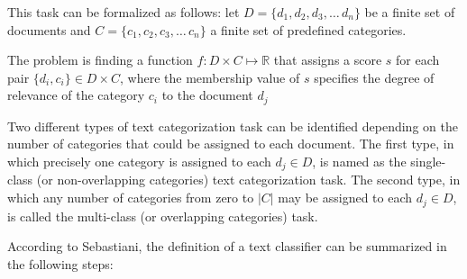 This task can be formalized as follows: let $D = \{d_1,d_2,d_3,\ldots\,d_n\}$ be a finite set of documents and $C = \{c_1,c_2,c_3,\ldots\,c_n\}$ a finite set of predefined categories.

The problem is finding a function $f: D \times C \mapsto \mathbb{R}$ that assigns a score $s$ for each pair 
$\{d_i, c_i\} \in  D \times C $, where the membership value of  $s$ specifies the degree of relevance of the category $c_i$ to the document $d_j$

Two different types of text categorization task can be identified depending on
the number of categories that could be assigned to each document. The first
type, in which precisely one category is assigned to each $d_j \in D$, is named as the single-class (or non-overlapping categories) text categorization task.
The second type, in which any number of categories from zero to $|C|$ may be
assigned to each $d_j \in D$, is called the multi-class (or overlapping categories) task.


According to Sebastiani\cite{Sebastiani:2002}, the definition of a text classifier can be summarized in the following steps:

